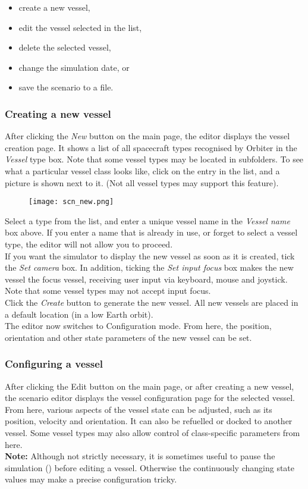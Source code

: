 \documentclass[Orbiter User Manual.tex]{subfiles}
\begin{document}
\begin{itemize}
\item create a new vessel,
\item edit the vessel selected in the list,
\item delete the selected vessel,
\item change the simulation date, or
\item save the scenario to a file.
\end{itemize}


\subsubsection{Creating a new vessel}
After clicking the \textit{New} button on the main page, the editor displays the vessel creation page. It shows a list of all spacecraft types recognised by Orbiter in the \textit{Vessel} type box. Note that some vessel types may be located in subfolders. To see what a particular vessel class looks like, click on the entry in the list, and a picture is shown next to it. (Not all vessel types may support this feature).

\begin{figure}[H]
	\centering
	\texttt{[image: scn\_new.png]}
\end{figure}

\noindent
Select a type from the list, and enter a unique vessel name in the \textit{Vessel name} box above. If you enter a name that is already in use, or forget to select a vessel type, the editor will not allow you to proceed.\\
If you want the simulator to display the new vessel as soon as it is created, tick the \textit{Set camera} box. In addition, ticking the \textit{Set input focus} box makes the new vessel the focus vessel, receiving user input via keyboard, mouse and joystick. Note that some vessel types may not accept input focus.\\
Click the \textit{Create} button to generate the new vessel. All new vessels are placed in a default location (in a low Earth orbit).\\
The editor now switches to Configuration mode. From here, the position, orientation and other state parameters of the new vessel can be set.


\subsubsection{Configuring a vessel}
After clicking the Edit button on the main page, or after creating a new vessel, the scenario editor displays the vessel configuration page for the selected vessel. From here, various aspects of the vessel state can be adjusted, such as its position, velocity and orientation. It can also be refuelled or docked to another vessel. Some vessel types may also allow control of class-specific parameters from here.\\
\textbf{Note:} Although not strictly necessary, it is sometimes useful to pause the simulation (\Ctrl{}) before editing a vessel. Otherwise the continuously changing state values may make a precise configuration tricky.
\end{document}
